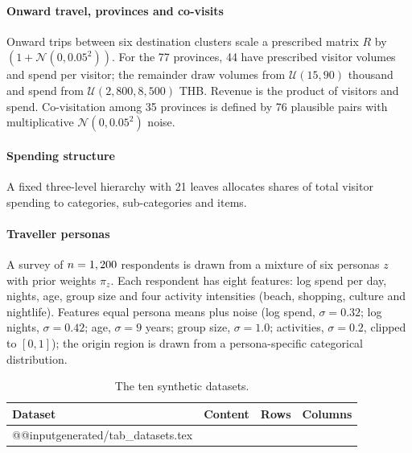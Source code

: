 \documentclass{article}
\makeatletter
\newcommand{\inputrows}[1]{\csname @@input\endcsname #1 }  %
\makeatother
\begin{document}
\paragraph{Onward travel, provinces and co-visits}
Onward trips between six destination clusters scale a prescribed matrix $R$ by
$(1+\mathcal{N}(0, 0.05^2))$. For the 77 provinces, 44 have prescribed visitor volumes and spend per
visitor; the remainder draw volumes from $\mathcal{U}(15, 90)$ thousand and spend from
$\mathcal{U}(2{,}800, 8{,}500)$ THB. Revenue is the product of visitors and spend. Co-visitation among 35
provinces is defined by 76 plausible pairs with multiplicative $\mathcal{N}(0, 0.05^2)$ noise.

\paragraph{Spending structure}
A fixed three-level hierarchy with 21 leaves allocates shares of total visitor spending to categories,
sub-categories and items.

\paragraph{Traveller personas}
A survey of $n = 1,200$ respondents is drawn from a mixture of six personas $z$ with prior weights
$\pi_z$. Each respondent has eight features: log spend per day, nights, age, group size and four activity
intensities (beach, shopping, culture and nightlife). Features equal persona means plus noise (log spend,
$\sigma = 0.32$; log nights, $\sigma = 0.42$; age, $\sigma = 9$ years; group size, $\sigma = 1.0$;
activities, $\sigma = 0.2$, clipped to $[0,1]$); the origin region is drawn from a persona-specific
categorical distribution.

\begin{table}[!htbp]
\centering
\caption{The ten synthetic datasets.}
\label{tab:datasets}
\small
\begin{tabularx}{\linewidth}{@{}l>{\raggedright\arraybackslash}Xrr@{}}
\toprule
Dataset & Content & Rows & Columns \\
\midrule
\inputrows{generated/tab_datasets.tex}
\bottomrule
\end{tabularx}
\end{table}
\end{document}
